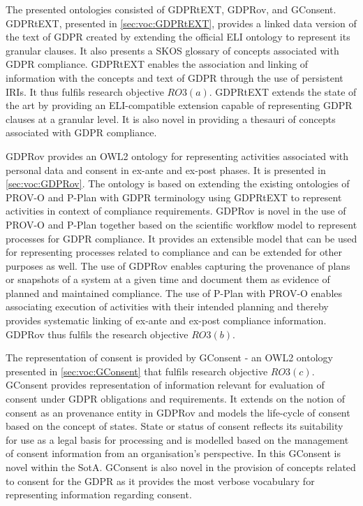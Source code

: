 The presented ontologies consisted of GDPRtEXT, GDPRov, and GConsent.
GDPRtEXT, presented in \autoref{sec:voc:GDPRtEXT}, provides a linked data version of the text of GDPR created by extending the official ELI \cite{ELI_2012} ontology to represent its granular clauses. It also presents a SKOS glossary of concepts associated with GDPR compliance. GDPRtEXT enables the association and linking of information with the concepts and text of GDPR through the use of persistent IRIs. It thus fulfils research objective $RO3(a)$. GDPRtEXT extends the state of the art by providing an ELI-compatible extension capable of representing GDPR clauses at a granular level. It is also novel in providing a thesauri of concepts associated with GDPR compliance.

GDPRov provides an OWL2 ontology for representing activities associated with personal data and consent in ex-ante and ex-post phases. It is presented in \autoref{sec:voc:GDPRov}.
The ontology is based on extending the existing ontologies of PROV-O \cite{lebo_prov-o_2013} and P-Plan \cite{garijo_p-plan_2014} with GDPR terminology using GDPRtEXT to represent activities in context of compliance requirements. GDPRov is novel in the use of PROV-O and P-Plan together based on the scientific workflow model to represent processes for GDPR compliance.
It provides an extensible model that can be used for representing processes related to compliance and can be extended for other purposes as well.
The use of GDPRov enables capturing the provenance of plans or snapshots of a system at a given time and document them as evidence of planned and maintained compliance.
The use of P-Plan with PROV-O enables associating execution of activities with their intended planning and thereby provides systematic linking of ex-ante and ex-post compliance information.
GDPRov thus fulfils the research objective $RO3(b)$.

The representation of consent is provided by GConsent - an OWL2 ontology presented in \autoref{sec:voc:GConsent} that fulfils research objective $RO3(c)$.
GConsent provides representation of information relevant for evaluation of consent under GDPR obligations and requirements.
It extends on the notion of consent as an provenance entity in GDPRov and models the life-cycle of consent based on the concept of states.
State or status of consent reflects its suitability for use as a legal basis for processing and is modelled based on the management of consent information from an organisation's perspective. In this GConsent is novel within the SotA.
GConsent is also novel in the provision of concepts related to consent for the GDPR as it provides the most verbose vocabulary for representing information regarding consent.

